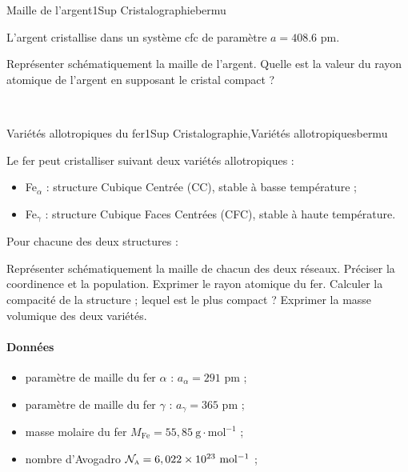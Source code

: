 \begin{exercise}{Maille de l'argent}{1}{Sup}
{Cristalographie}{bermu}

L’argent cristallise dans un système cfc de paramètre $a = 408.6$ pm.

\begin{questions}
    \question Représenter schématiquement la maille de l'argent.
    \question Quelle est la valeur du rayon atomique de l’argent en supposant le cristal compact ?
\end{questions}
\end{exercise}

\begin{solution}
    \begin{questions}
        \question ~
        \question 
    \end{questions}
\end{solution}




\begin{exercise}{Variétés allotropiques du fer}{1}{Sup}
{Cristalographie,Variétés allotropiques}{bermu}

Le fer peut cristalliser suivant deux variétés allotropiques :
\begin{itemize}
    \item Fe$_\alpha$ : structure Cubique Centrée (CC), stable à basse température ;
    \item Fe$_\gamma$ : structure Cubique Faces Centrées (CFC), stable à haute température.
\end{itemize}

\noindent Pour chacune des deux structures :
\begin{questions}
    \question Représenter schématiquement la maille de chacun des deux réseaux.
    \question Préciser la coordinence et la population.
    \question Exprimer le rayon atomique du fer.
    \question Calculer la compacité de la structure ; lequel est le plus compact ?
    \question Exprimer la masse volumique des deux variétés.
\end{questions}

\paragraph{Données}
\begin{itemize}
    \item paramètre de maille du fer $\alpha$ : $a_\alpha = 291$ pm ;
    \item paramètre de maille du fer $\gamma$ : $a_\gamma = 365$ pm ;
    \item masse molaire du fer $M_\text{Fe} = 55,85~\mathrm{g\cdot mol^{-1}}$ ;
    \item nombre d'Avogadro $\cal{N}_\textsc{a} = 6,022\times 10^{23}~\mathrm{mol^{-1}}$ ;
\end{itemize}
\end{exercise}

